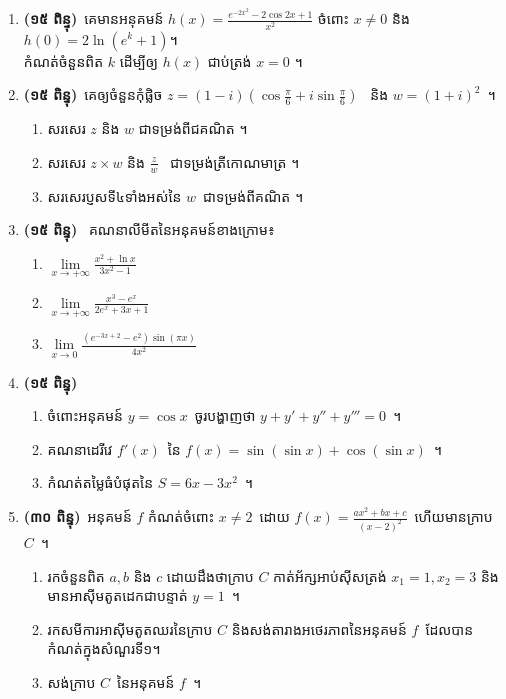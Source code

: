\documentclass[12pt, a4paper]{article}
\begin{document}
\maketitle
\begin{enumerate}
	\item\textbf{(១៥ ពិន្ទុ)}~គេមានអនុគមន៍ $h(x)=\frac{e^{-2x^2}-2\cos2x+1}{x^2}$ ចំពោះ $x\neq0$
		និង $h(0)=2\ln(e^k+1)$។\\ កំណត់ចំនួនពិត $k$ ដើម្បីឲ្យ $h(x)$ ជាប់ត្រង់ $x=0$ ។
	\item\textbf{(១៥ ពិន្ទុ)}~គេឲ្យចំនួនកំុផ្លិច $ z=(1-i)(\cos\frac{\pi}{6}+i\sin\frac{\pi}{6})$~ និង $w=(1+i)^2$~។
	\begin{enumerate}[m]
		\item សរសេរ $z$ និង $w$ ជាទម្រង់ពីជគណិត ។
		\item សរសេរ $z\times w$ និង $\frac{z}{w}$~ ជាទម្រង់ត្រីកោណមាត្រ ។
		\item សរសេរប្ញសទី៤ទាំងអស់នៃ $w$~ជាទម្រង់ពីគណិត ។
	\end{enumerate}
	\item\textbf{(១៥ ពិន្ទុ)}~ គណនាលីមីតនៃអនុគមន៍ខាងក្រោម៖
		\begin{enumerate}[k,3]
			\item $\lim\limits_{x\to+\infty}\frac{x^2+\ln x}{3x^2-1}$~
			\item $\lim\limits_{x\to+\infty}\frac{x^3-e^x}{2e^x+3x+1}$~
			\item $\lim\limits_{x\to0}\frac{(e^{-3x+2}-e^2)\sin(\pi x)}{4x^2}$~
		\end{enumerate}
	\item\textbf{(១៥ ពិន្ទុ)}~
		\begin{enumerate}[m]
			\item ចំពោះអនុគមន៍ $y=\cos x$~ចូរបង្ហាញថា $y+y'+y''+y'''=0$~។
			\item គណនាដេរីវេ $f'(x)$~នៃ $f(x)=\sin(\sin x)+\cos(\sin x)$~។
			\item កំណត់តម្លៃធំបំផុតនៃ $S=6x-3x^2$~។
		\end{enumerate}
	\item\textbf{(៣០ ពិន្ទុ)}~អនុគមន៍ $f$ កំណត់ចំពោះ $x\neq2$~ដោយ $f(x)=\frac{ax^2+bx+c}{(x-2)^2}$~ហើយមានក្រាប $C$~។
	\begin{enumerate}[m]
		\item រកចំនួនពិត $a,b$ និង $c$ ដោយដឹងថាក្រាប $C$ កាត់អ័ក្សអាប់ស៊ីសត្រង់ $x_1=1, x_2=3$ និងមានអាស៊ីមតូតដេកជាបន្ទាត់ $y=1$~។
		\item រកសមីការអាស៊ីមតូតឈរនៃក្រាប $C$ និងសង់តារាងអថេរភាពនៃអនុគមន៍ $f$~ដែលបានកំណត់ក្នុងសំណួរទី១។
		\item សង់ក្រាប $C$~នៃអនុគមន៍ $f$~។

\end{enumerate}
\end{enumerate}
\end{document}
